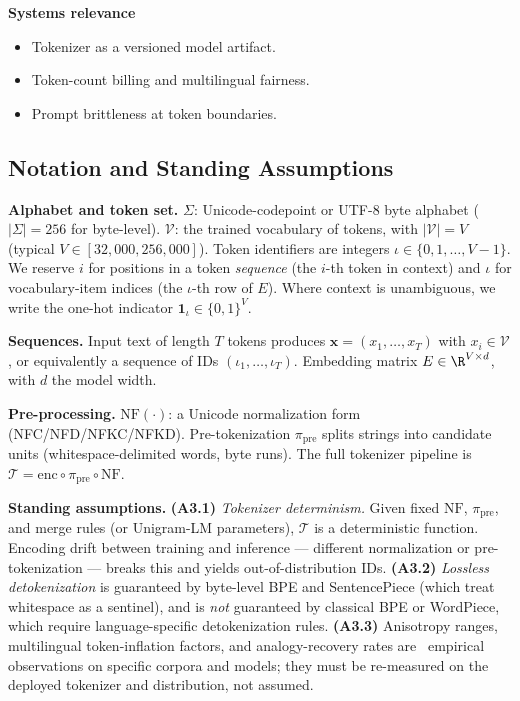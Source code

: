 \textbf{Systems relevance}
\begin{itemize}
  \item Tokenizer as a versioned model artifact.
  \item Token-count billing and multilingual fairness.
  \item Prompt brittleness at token boundaries.
\end{itemize}

\subsection{Notation and Standing Assumptions}
\label{sec:week3-notation}

\begin{notationbox}
\textbf{Alphabet and token set.}
$\Sigma$: Unicode-codepoint or UTF-8 byte alphabet ($|\Sigma| = 256$
for byte-level). $\mathcal{V}$: the trained vocabulary of tokens,
with $|\mathcal{V}| = V$ (typical $V \in [32{,}000, 256{,}000]$).
Token identifiers are integers $\iota \in \{0, 1, \dots, V-1\}$. We
reserve $i$ for positions in a token \emph{sequence} (the $i$-th
token in context) and $\iota$ for vocabulary-item indices (the
$\iota$-th row of $E$). Where context is unambiguous, we write the
one-hot indicator $\mathbf{1}_\iota \in \{0,1\}^V$.

\textbf{Sequences.}
Input text of length $T$ tokens produces
$\mathbf{x} = (x_1, \dots, x_T)$ with $x_i \in \mathcal{V}$, or
equivalently a sequence of IDs $(\iota_1, \dots, \iota_T)$.
Embedding matrix $E \in \R^{V \times d}$, with $d$ the model width.

\textbf{Pre-processing.}
$\mathrm{NF}(\cdot)$: a Unicode normalization form
(NFC/NFD/NFKC/NFKD). Pre-tokenization $\pi_{\mathrm{pre}}$ splits
strings into candidate units (whitespace-delimited words, byte
runs). The full tokenizer pipeline is
$\mathcal{T} = \mathrm{enc}\circ\pi_{\mathrm{pre}}\circ\mathrm{NF}$.

\textbf{Standing assumptions.}
\textbf{(A3.1)} \emph{Tokenizer determinism.} Given fixed
$\mathrm{NF}$, $\pi_{\mathrm{pre}}$, and merge rules (or Unigram-LM
parameters), $\mathcal{T}$ is a deterministic function. Encoding
drift between training and inference --- different normalization or
pre-tokenization --- breaks this and yields out-of-distribution IDs.
\textbf{(A3.2)} \emph{Lossless detokenization} is guaranteed by
byte-level BPE and SentencePiece (which treat whitespace as a
sentinel), and is \emph{not} guaranteed by classical BPE or
WordPiece, which require language-specific detokenization rules.
\textbf{(A3.3)} Anisotropy ranges, multilingual token-inflation
factors, and analogy-recovery rates are \Emp\ empirical observations
on specific corpora and models; they must be re-measured on the
deployed tokenizer and distribution, not assumed.
\end{notationbox}

